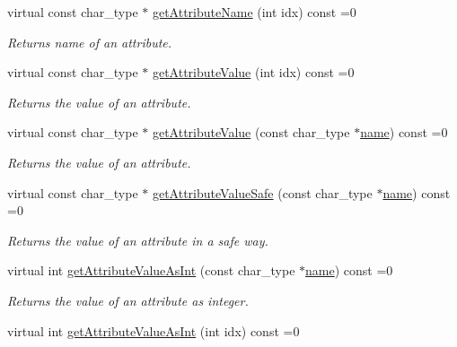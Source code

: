 \begin{CompactItemize}
virtual const char\_\-type $\ast$ \hyperlink{classirr_1_1io_1_1_i_irr_x_m_l_reader_a0807dc565c67fcf355e656df1a326ef}{getAttributeName} (int idx) const =0
\begin{CompactList}\small\item\em Returns name of an attribute. \item\end{CompactList}\item 
virtual const char\_\-type $\ast$ \hyperlink{classirr_1_1io_1_1_i_irr_x_m_l_reader_41bd71a1b9d4a80cd1d0257dedb35325}{getAttributeValue} (int idx) const =0
\begin{CompactList}\small\item\em Returns the value of an attribute. \item\end{CompactList}\item 
virtual const char\_\-type $\ast$ \hyperlink{classirr_1_1io_1_1_i_irr_x_m_l_reader_daac9a49b396e7fc2d335335f36391a9}{getAttributeValue} (const char\_\-type $\ast$\hyperlink{glext__bak_8h_bb62efe59ccdd153ce42e1a418352209}{name}) const =0
\begin{CompactList}\small\item\em Returns the value of an attribute. \item\end{CompactList}\item 
virtual const char\_\-type $\ast$ \hyperlink{classirr_1_1io_1_1_i_irr_x_m_l_reader_7674852b2e24b2710b90aab10ef1fc22}{getAttributeValueSafe} (const char\_\-type $\ast$\hyperlink{glext__bak_8h_bb62efe59ccdd153ce42e1a418352209}{name}) const =0
\begin{CompactList}\small\item\em Returns the value of an attribute in a safe way. \item\end{CompactList}\item 
virtual int \hyperlink{classirr_1_1io_1_1_i_irr_x_m_l_reader_b37bef58865355a7dba0011a38e6c8e7}{getAttributeValueAsInt} (const char\_\-type $\ast$\hyperlink{glext__bak_8h_bb62efe59ccdd153ce42e1a418352209}{name}) const =0
\begin{CompactList}\small\item\em Returns the value of an attribute as integer. \item\end{CompactList}\item 
virtual int \hyperlink{classirr_1_1io_1_1_i_irr_x_m_l_reader_8f2d57c9f358b9683fb177f440661426}{getAttributeValueAsInt} (int idx) const =0

\end{CompactItemize}
